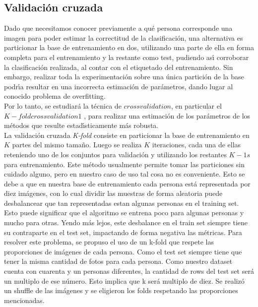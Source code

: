 \subsection{Validación cruzada}
Dado que necesitamos conocer previamente a qué persona corresponde una imagen para
poder estimar la correctitud de la clasificación, una alternativa es particionar la base de
entrenamiento en dos, utilizando una parte de ella en forma completa para el entrenamiento
y la restante como test, pudiendo ası́ corroborar la clasificación realizada, al contar con el
etiquetado del entrenamiento. Sin embargo, realizar toda la experimentación sobre una única
partición de la base podrı́a resultar en una incorrecta estimación de parámetros, dando lugar
al conocido problema de overfitting.\\
Por lo tanto, se estudiará la técnica de $cross validation$, en particular el $K-fold cross
validation 1$ , para realizar una estimación de los parámetros de los métodos que resulte estadı́sticamente más robusta.\\


La validación cruzada \textit{K-fold} consiste en particionar la base de entrenamiento en $K$ partes del mismo tamaño. Luego se realiza $K$ iteraciones, cada una de ellas reteniendo uno de los conjuntos para validación y utilizando los restantes $K - 1s$ para entrenamiento. Este método usualmente permite tomar las particiones sin cuidado alguno, pero en nuestro caso de uso tal cosa no es conveniente. Esto se debe a que en nuestra base de entrenamiento cada persona está representada por diez imágenes, con lo cual dividir las muestras de forma aleatoria puede desbalancear que tan representadas estan algunas personas en el training set. Esto puede significar que el algoritmo se entrena poco para algunas personas y mucho para otras. Yendo más lejos, este desbalance en el train set siempre tiene su contraparte en el test set, impactando de forma negativa las métricas.
Para resolver este problema, se propuso el uso de un k-fold que respete las proporciones de imágenes de cada persona. Como el test set siempre tiene que tener la misma cantidad de fotos para cada persona. Como nuestro dataset cuenta con cuarenta y un personas diferentes, la cantidad de rows del test set será un multiplo de ese número. Esto implica que k será multiplo de diez. Se realizó un shuffle de las imágenes y se eligieron los folds respetando las proporciones mencionadas.

